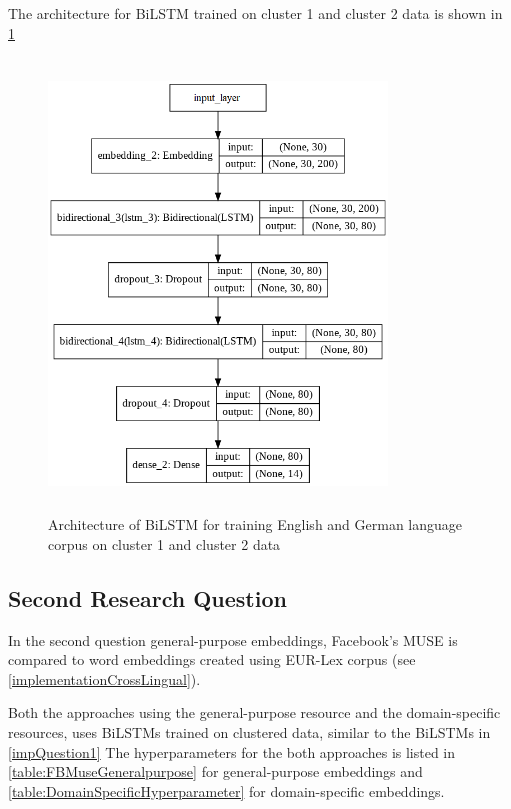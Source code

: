 The architecture for \gls{BiLSTM} trained on cluster 1 and cluster 2 data is shown in \ref{fig:cluster1&2LSTM}



\begin{figure}[!ht]
    \centering
    \includegraphics[width=9cm, height=12cm]{pics/LSTM_LEGALEMB_CLUSTER_1.png}
    \captionsetup{justification=centering,margin=2cm}
    \caption{Architecture of \gls{BiLSTM} for training English and German language corpus on cluster 1 and cluster 2 data}
    \label{fig:cluster1&2LSTM}
\end{figure}


\clearpage

\subsection{Second Research Question}
In the second question general-purpose embeddings, Facebook's MUSE is compared to word embeddings created using EUR-Lex corpus (see \ref{implementationCrossLingual}).

Both the approaches using the general-purpose resource and the domain-specific resources, uses \glspl{BiLSTM} trained on clustered data, similar to the \glspl{BiLSTM} in \ref{impQuestion1}
The hyperparameters for the both approaches is listed in \ref{table:FBMuseGeneralpurpose} for general-purpose embeddings and \ref{table:DomainSpecificHyperparameter} for domain-specific embeddings.

